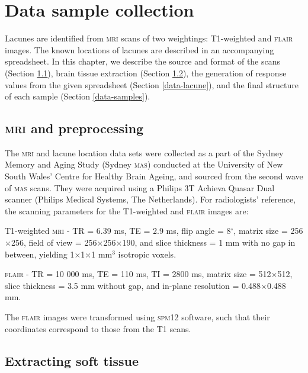 %
%

\chapter{Data sample collection}\label{data}

Lacunes are identified from \textsc{mri} scans of two weightings: T1-weighted and \textsc{flair} images. The known locations of lacunes are described in an accompanying spreadsheet. In this chapter, we describe the source and format of the scans (Section \ref{data-mri}), brain tissue extraction (Section \ref{data-soft}), the generation of response values from the given spreadsheet (Section \ref{data-lacune}), and the final structure of each sample (Section \ref{data-samples}).

\section{\textsc{mri} and preprocessing}\label{data-mri}

The \textsc{mri} and lacune location data sets were collected as a part of the Sydney Memory and Aging Study (Sydney \textsc{mas}) conducted at the University of New South Wales' Centre for Healthy Brain Ageing, and sourced from the second wave of \textsc{mas} scans. They were acquired using a Philips 3T Achieva Quasar Dual scanner (Philips Medical Systems, The Netherlands). For radiologists' reference, the scanning parameters for the T1-weighted and \textsc{flair} images are:

T1-weighted \textsc{mri} - TR = 6.39 ms, TE = 2.9 ms, flip angle = 8$^\circ$, matrix size = 256$\times$256, field of view = 256$\times$256$\times$190, and slice thickness = 1 mm with no gap in between, yielding 1$\times$1$\times$1 mm$^3$ isotropic voxels.

\textsc{flair} - TR = 10 000 ms, TE = 110 ms, TI = 2800 ms, matrix size = 512$\times$512, slice thickness = 3.5 mm without gap, and in-plane resolution = 0.488$\times$0.488 mm.

The \textsc{flair} images were transformed using \textsc{spm12} software, such that their coordinates correspond to those from the T1 scans.

\section{Extracting soft tissue}\label{data-soft}

